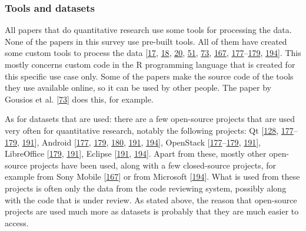\documentclass[]{book}
\begin{document}
\subsubsection{Tools and datasets}\label{tools-and-datasets}

All papers that do quantitative research use some tools for processing
the data. None of the papers in this survey use pre-built tools. All of
them have created some custom tools to process the data
{[}\protect\hyperlink{ref-baysal2016investigating}{17},
\protect\hyperlink{ref-baysal2013influence}{18},
\protect\hyperlink{ref-beller2014modern}{20},
\protect\hyperlink{ref-czerwonka2015code}{51},
\protect\hyperlink{ref-gousios2014exploratory}{73},
\protect\hyperlink{ref-shimagaki2016study}{167},
\protect\hyperlink{ref-thongtanunam2017review}{177}--\protect\hyperlink{ref-thongtanunam2015should}{179},
\protect\hyperlink{ref-zanjani2016automatically}{194}{]}. This mostly
concerns custom code in the R programming language that is created for
this specific use case only. Some of the papers make the source code of
the tools they use available online, so it can be used by other people.
The paper by Gousios et al.
{[}\protect\hyperlink{ref-gousios2014exploratory}{73}{]} does this, for
example.

As for datasets that are used: there are a few open-source projects that
are used very often for quantitative research, notably the following
projects: Qt {[}\protect\hyperlink{ref-mcintosh2014impact}{128},
\protect\hyperlink{ref-thongtanunam2017review}{177}--\protect\hyperlink{ref-thongtanunam2015should}{179},
\protect\hyperlink{ref-yang2016mining}{191}{]}, Android
{[}\protect\hyperlink{ref-thongtanunam2017review}{177},
\protect\hyperlink{ref-thongtanunam2015should}{179},
\protect\hyperlink{ref-thongtanunam2014reda}{180},
\protect\hyperlink{ref-yang2016mining}{191},
\protect\hyperlink{ref-zanjani2016automatically}{194}{]}, OpenStack
{[}\protect\hyperlink{ref-thongtanunam2017review}{177}--\protect\hyperlink{ref-thongtanunam2015should}{179},
\protect\hyperlink{ref-yang2016mining}{191}{]}, LibreOffice
{[}\protect\hyperlink{ref-thongtanunam2015should}{179},
\protect\hyperlink{ref-yang2016mining}{191}{]}, Eclipse
{[}\protect\hyperlink{ref-yang2016mining}{191},
\protect\hyperlink{ref-zanjani2016automatically}{194}{]}. Apart from
these, mostly other open-source projects have been used, along with a
few closed-source projects, for example from Sony Mobile
{[}\protect\hyperlink{ref-shimagaki2016study}{167}{]} or from Microsoft
{[}\protect\hyperlink{ref-zanjani2016automatically}{194}{]}. What is
used from these projects is often only the data from the code reviewing
system, possibly along with the code that is under review. As stated
above, the reason that open-source projects are used much more as
datasets is probably that they are much easier to access.
\end{document}
